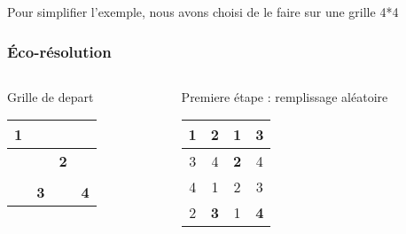 \begin{frame}
	Pour simplifier l'exemple, nous avons choisi de le faire sur une grille 4*4
    \frametitle{Éco-résolution}
    	\begin{columns}[t]
    \begin{column}{5cm}
    \begin{block}{Grille de depart}
	\begin{center}
         \begin{tabular}{|c|c| |c|c| }
               \hline
               \textbf{1}&&&\\
               \hline
               &&\textbf{2}&\\
               \hline
               \hline
               &&&\\
               \hline
               &\textbf{3}&&\textbf{4}\\                      
            \hline
        \end{tabular}
    \end{center}
    
     \end{block} 

    \end{column}
    
   \pause  
  \begin{column}{5cm}
  \begin{block}{Premiere étape : remplissage aléatoire}
    \begin{center}
         \begin{tabular}{|c|c| |c|c| }
               \hline
               \textbf{1}&2&1&3\\
               \hline
               3&4&\textbf{2}&4\\
               \hline
               \hline
               4&1&2&3\\
               \hline
               2&\textbf{3}&1&\textbf{4}\\                      
            \hline
        \end{tabular}
    \end{center}
  \end{block}   
  \end{column}
 \end{columns}  
\end{frame}

